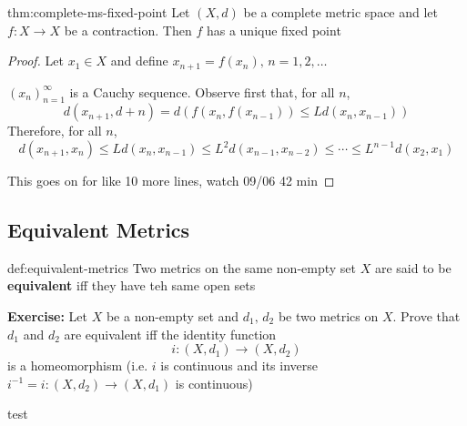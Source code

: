 \documentclass{article}
\begin{document}
\begin{thm}{thm:complete-ms-fixed-point}{}
    Let $(X, d)$ be a complete metric space and let $f : X \to X$ be a contraction. Then $f$ has a unique fixed point
\end{thm}

\begin{proof}
    Let $x_{1}\in X$ and define $x_{n+1} = f(x_{n}),\, n = 1,2,\dots$

    $(x_{n})^{\infty}_{n = 1}$ is a Cauchy sequence. Observe first that, for all $n$,
    \[d(x_{n+1}, d+n) = d(f(x_{n}, f(x_{n-1})) \le L d(x_{n}, x_{n-1}))\]
    Therefore, for all $n$,
    \[d(x_{n+1}, x_{n}) \le Ld(x_{n}, x_{n-1})\le L^{2}d(x_{n-1},x_{n-2}) \le \cdots \le L^{n-1}d(x_{2}, x_{1})\]

    This goes on for like 10 more lines, watch 09/06 42 min
\end{proof}

\subsection{Equivalent Metrics}
\begin{dfn}{def:equivalent-metrics}{}
    Two metrics on the same non-empty set $X$ are said to be \textbf{equivalent} iff they have teh same open sets
\end{dfn}

\textbf{Exercise:} Let $X$ be a non-empty set and $d_{1},\,d_{2}$ be two metrics on $X$. Prove that $d_{1}$ and $d_{2}$ are equivalent iff the identity function
\[i : (X, d_{1}) \to (X, d_{2})\]
is a homeomorphism (i.e. $i$ is continuous and its inverse $i^{-1} = i : (X, d_{2})\to (X, d_{1})$ is continuous)

\newpage
test
\end{document}
